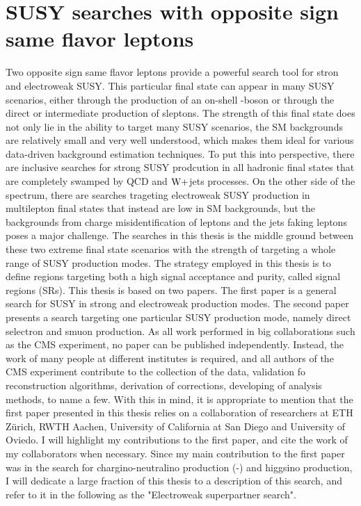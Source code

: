 \section{SUSY searches with opposite sign same flavor leptons}
\noindent
\justify
Two opposite sign same flavor leptons provide a powerful search tool for stron and electroweak SUSY. 
This particular final state can appear in many SUSY scenarios, either through the production of an on-shell \PZ-boson or through the direct or intermediate production of sleptons. 
The strength of this final state does not only lie in the ability to target many SUSY scenarios, the SM backgrounds are relatively small and very well understood, which makes them ideal for various data-driven background estimation techniques. 
To put this into perspective, there are inclusive searches for strong SUSY prodcution in all hadronic final states that are completely swamped by QCD and $\mathrm{W}+$jets processes. 
On the other side of the spectrum, there are searches trageting electroweak SUSY production in multilepton final states that instead are low in SM backgrounds, but the backgrounds from charge misidentification of leptons and the jets faking leptons poses a major challenge. 
The searches in this thesis is the middle ground between these two extreme final state scenarios with the strength of targeting a whole range of SUSY production modes.   
The strategy employed in this thesis is to define regions targeting both a high signal acceptance and purity, called signal regions (SRs).
This thesis is based on two papers. 
The first paper \cite{Sirunyan:2017qaj} is a general search for SUSY in strong and electroweak production modes. 
The second paper \cite{Sirunyan:2018nwe} presents a search targeting one particular SUSY production mode, namely direct selectron and smuon production.  
As all work performed in big collaborations such as the CMS experiment, no paper can be published independently. 
Instead, the work of many people at different institutes is required, and all authors of the CMS experiment contribute to the collection of the data, validation fo reconstruction algorithms, derivation of corrections, developing of analysis methods, to name a few. 
With this in mind, it is appropriate to mention that the first paper presented in this thesis relies on a collaboration of researchers at ETH Z\"{u}rich, RWTH Aachen, University of California at San Diego and University of Oviedo. 
I will highlight my contributions to the first paper, and cite the work of my collaborators when necessary. 
Since my main contribution to the first paper was in the search for chargino-neutralino production (\firstcharg-\secondchi) and higgsino production, I will dedicate a large fraction of this thesis to a description of this search, and refer to it in the following as the "Electroweak superpartner search".
